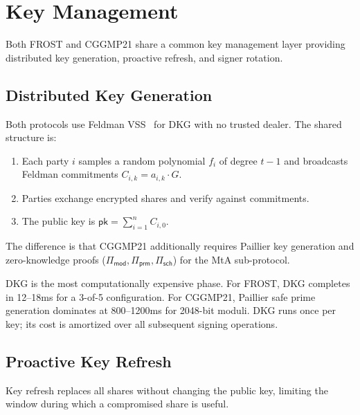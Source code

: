 \section{Key Management}

\label{sec:keymgmt}

Both FROST and CGGMP21 share a common key management layer providing distributed key
generation, proactive refresh, and signer rotation.

\subsection{Distributed Key Generation}

Both protocols use Feldman VSS~\cite{feldman1987} for DKG with no trusted dealer.
The shared structure is:

\begin{enumerate}[nosep]
  \item Each party $i$ samples a random polynomial $f_i$ of degree $t-1$ and broadcasts
    Feldman commitments $C_{i,k} = a_{i,k} \cdot G$.
  \item Parties exchange encrypted shares and verify against commitments.
  \item The public key is $\mathsf{pk} = \sum_{i=1}^n C_{i,0}$.
\end{enumerate}

The difference is that CGGMP21 additionally requires Paillier key generation and
zero-knowledge proofs ($\Pi_{\mathsf{mod}}, \Pi_{\mathsf{prm}}, \Pi_{\mathsf{sch}}$)
for the MtA sub-protocol.

\begin{remark}
DKG is the most computationally expensive phase. For FROST, DKG completes in 12--18ms
for a 3-of-5 configuration. For CGGMP21, Paillier safe prime generation dominates at
800--1200ms for 2048-bit moduli. DKG runs once per key; its cost is amortized over all
subsequent signing operations.
\end{remark}

\subsection{Proactive Key Refresh}
\label{sec:refresh}

Key refresh replaces all shares without changing the public key, limiting the window
during which a compromised share is useful.

